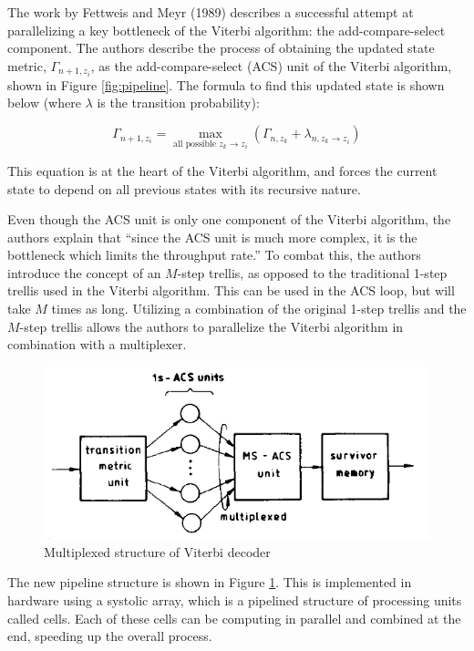 \documentclass[11pt,onecolumn]{article}
\begin{document}
The work by Fettweis and Meyr (1989) \cite{acs:old} describes a successful attempt at parallelizing a key bottleneck of the Viterbi algorithm: the add-compare-select component. The authors describe the process of obtaining the updated state metric, $\Gamma_{n+1,z_{i}}$, as the add-compare-select (ACS) unit of the Viterbi algorithm, shown in Figure \ref{fig:pipeline}. The formula to find this updated state is shown below (where $\lambda$ is the transition probability):

\begin{equation}
\Gamma_{n+1,z_{i}} = \max\limits_{\text{all possible } z_{k}\rightarrow z_{i}} (\Gamma_{n,z_{k}} + \lambda_{n,z_{k}\rightarrow z_{i}})
\end{equation}

This equation is at the heart of the Viterbi algorithm, and forces the current state to depend on all previous states with its recursive nature. 

Even though the ACS unit is only one component of the Viterbi algorithm, the authors explain that ``since the ACS unit is much more complex, it is the bottleneck which limits the throughput rate.'' To combat this, the authors introduce the concept of an $M$-step trellis, as opposed to the traditional 1-step trellis used in the Viterbi algorithm. This can be used in the ACS loop, but will take $M$ times as long. Utilizing a combination of the original 1-step trellis and the $M$-step trellis allows the authors to parallelize the Viterbi algorithm in combination with a multiplexer.

\begin{figure}[h!]
\centering
\includegraphics[width=.5\linewidth]{figures/pipeline_multiplex}
\caption{Multiplexed structure of Viterbi decoder}
\label{fig:pipeline_multiplex}
\end{figure}

The new pipeline structure is shown in Figure \ref{fig:pipeline_multiplex}. This is implemented in hardware using a systolic array, which is a pipelined structure of processing units called cells. Each of these cells can be computing in parallel and combined at the end, speeding up the overall process.\\
\end{document}
